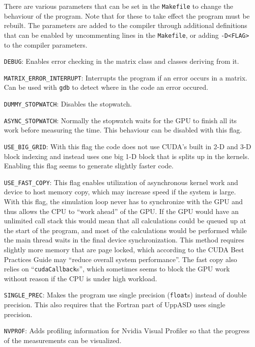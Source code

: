 \documentclass{article}
\begin{document}
There are various parameters that can be set in the \verb|Makefile| to 
change the behaviour of the program. Note that for these to take effect 
the program must be rebuilt. The parameters are added to the compiler 
through additional definitions that can be enabled by uncommenting lines 
in the \verb|Makefile|, or adding \verb|-D<FLAG>| to the compiler
parameters.

\begin{description}
\item{\verb|DEBUG|:} Enables error checking in the matrix class and classes 
deriving from it.

\item{\verb|MATRIX_ERROR_INTERRUPT|:} Interrupts the program if an error occurs 
in a matrix. Can be used with \verb|gdb| to detect where in the code an error 
occured.

\item{\verb|DUMMY_STOPWATCH|:} Disables the stopwatch.

\item{\verb|ASYNC_STOPWATCH|:} Normally the stopwatch waits for the GPU to 
finish all its work before measuring the time. This behaviour can be disabled 
with this flag.

\item{\verb|USE_BIG_GRID|:} With this flag the code does not use CUDA's built 
in 2-D and 3-D block indexing and instead uses one big 1-D block that is splits
up in the kernels. Enabling this flag seems to generate slightly faster code.

\item{\verb|USE_FAST_COPY|:} This flag enables utilization of asynchronous 
kernel work and device to host memory copy, which may increase speed if the 
system is large. With this flag, the simulation loop never has to synchronize 
with the GPU and thus allows the CPU to ``work ahead'' of the GPU. If the GPU 
would have an unlimited call stack this would mean that all calculations 
could be queued up at the start of the program, and most of the calculations 
would be performed while the main thread waits in the final device 
synchronization. This method requires slightly more memory that are page 
locked, which according to the CUDA Best Practices Guide may ``reduce overall 
system performance''. The fast copy also relies on ``\verb|cudaCallback|s'', 
which sometimes seems to block the GPU work without reason if the CPU is 
under high workload.

\item{\verb|SINGLE_PREC|:} Makes the program use single precision 
(\verb|float|s) instead of double precision. This also requires that the 
Fortran part of UppASD uses single precision.

\item{\verb|NVPROF|:} Adds profiling information for Nvidia Visual Profiler so 
that the progress of the measurements can be visualized.

\end{description}
\end{document}
